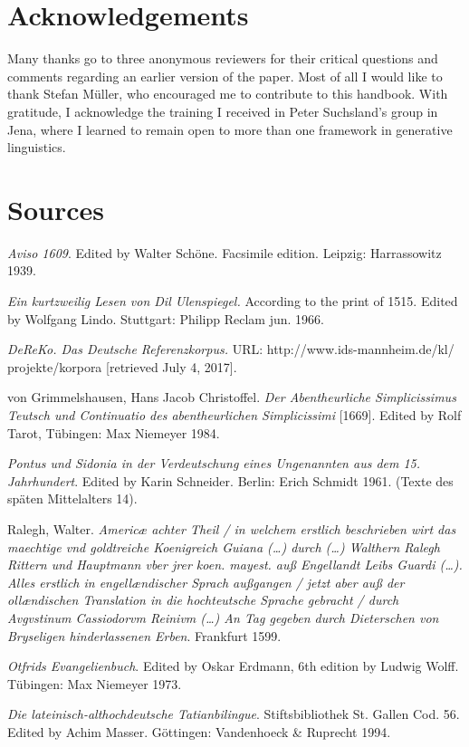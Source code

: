\documentclass[output=paper
                ,modfonts
                ,nonflat
	        ,collection
	        ,collectionchapter
	        ,collectiontoclongg
 	        ,biblatex
                ,babelshorthands
                ,newtxmath
                ,draftmode
                ,colorlinks, citecolor=brown
]{./langsci/langscibook}
\begin{document}
\section*{Acknowledgements}
Many thanks go to three anonymous reviewers for their critical questions and comments regarding an earlier version of the paper. Most of all I would like to thank Stefan Müller, who encouraged me to contribute to this handbook. With gratitude, I acknowledge the training I received in Peter Suchsland's group in Jena, where I learned to remain open to more than one framework in generative linguistics.

\section*{Sources}
\begin{description}
\setlength{\itemsep}{0pt}
\item \textit{Aviso 1609}. Edited by Walter Schöne. Facsimile edition. Leipzig: Harrassowitz 1939.
\item \textit{Ein kurtzweilig Lesen von Dil Ulenspiegel.} According to the print of 1515. Edited by Wolfgang Lindo. Stuttgart: Philipp Reclam jun. 1966.
\item \textit{DeReKo. Das Deutsche Referenzkorpus.} URL: http://www.ids-mannheim.de/kl/\\projekte/korpora [retrieved July 4, 2017].
\item von Grimmelshausen, Hans Jacob Christoffel. \textit{Der Abentheurliche Simplicissimus Teutsch und Continuatio des abentheurlichen Simplicissimi} [1669]. Edited by Rolf Tarot, Tübingen: Max Niemeyer 1984.
\item \textit{Pontus und Sidonia in der Verdeutschung eines Ungenannten aus dem 15. Jahrhundert}. Edited by Karin Schneider. Berlin: Erich Schmidt 1961. (Texte des späten Mittelalters 14).
\item Ralegh, Walter. \textit{Americæ achter Theil / in welchem erstlich beschrieben wirt das maechtige vnd goldtreiche Koenigreich Guiana (\dots) durch (\dots) Walthern Ralegh Rittern und Hauptmann vber jrer koen. mayest. auß Engellandt Leibs Guardi (\dots). Alles erstlich in engellændischer Sprach außgangen / jetzt aber auß der ollændischen Translation in die hochteutsche Sprache gebracht / durch Avgvstinum Cassiodorvm Reinivm (\dots) An Tag gegeben durch Dieterschen von Bryseligen hinderlassenen Erben}. Frankfurt 1599.
\item \textit{Otfrids Evangelienbuch}. Edited by Oskar Erdmann, 6th edition by Ludwig Wolff. Tübingen: Max Niemeyer 1973.
\item \textit{Die lateinisch-althochdeutsche Tatianbilingue}. Stiftsbibliothek St. Gallen Cod. 56. Edited by Achim Masser. Göttingen: Vandenhoeck \& Ruprecht 1994.
\end{description}

{\sloppy
\printbibliography[heading=subbibliography,notkeyword=this]
}
\end{document}
